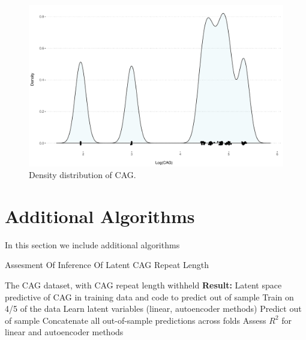 \documentclass[letterpaper]{article}
\begin{document}
\begin{figure}[ht!]
  \centering
  \includegraphics[width=\linewidth]{./images/cagPlots.pdf}
      \caption{\label{fig_cag_density} Density distribution of CAG. }
\end{figure}

\clearpage
\section{Additional Algorithms}
In this section we include additional algorithms

\begin{algorithm}%
 \caption{Assesment Of Inference Of Latent CAG Repeat Length}
 \label{alg_cag}
\begin{algorithmic}
 The CAG dataset, with CAG repeat length withheld
\State \textbf{Result:} Latent space predictive of CAG in training data and code to predict out of sample
  \State Train on 4/5 of the data
  \State Learn latent variables (linear, autoencoder methods)
  \State Predict out of sample
 \EndFor
 \State Concatenate all out-of-sample predictions across folds
 \State Assess $R^{2}$ for linear and autoencoder methods
\end{algorithmic}
\end{algorithm}
\end{document}
